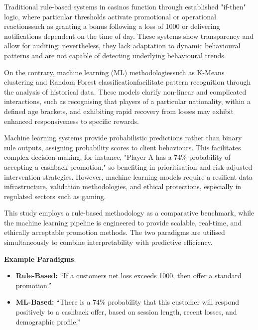\documentclass[12pt,a4paper]{report}
\begin{document}
Traditional rule-based systems in casinos function through established "if-then" logic, where particular thresholds activate promotional or operational reactionssuch as granting a bonus following a loss of 1000 or delivering notifications dependent on the time of day.  These systems show transparency and allow for auditing; nevertheless, they lack adaptation to dynamic behavioural patterns and are not capable of detecting underlying behavioural trends.

 On the contrary, machine learning (ML) methodologiessuch as K-Means clustering and Random Forest classificationfacilitate pattern recognition through the analysis of historical data.  These models clarify non-linear and complicated interactions, such as recognising that players of a particular nationality, within a defined age brackets, and exhibiting rapid recovery from losses may exhibit enhanced responsiveness to specific rewards.

 Machine learning systems provide probabilistic predictions rather than binary rule outputs, assigning probability scores to client behaviours.  This facilitates complex decision-making, for instance, "Player A has a 74\% probability of accepting a cashback promotion," so benefiting in prioritisation and risk-adjusted intervention strategies.  However, machine learning models require a resilient data infrastructure, validation methodologies, and ethical protections, especially in regulated sectors such as gaming.

 This study employs a rule-based methodology as a comparative benchmark, while the machine learning pipeline is engineered to provide scalable, real-time, and ethically acceptable promotion methods.  The two paradigms are utilised simultaneously to combine interpretability with predictive efficiency.

\vspace{0.2cm}
\textbf{Example Paradigms}:
\begin{itemize}
    \item \textbf{Rule-Based:} ``If a customers net loss exceeds 1000, then offer a standard promotion.''
    \item \textbf{ML-Based:} ``There is a 74\% probability that this customer will respond positively to a cashback offer, based on session length, recent losses, and demographic profile.''
\end{itemize}

\end{document}
